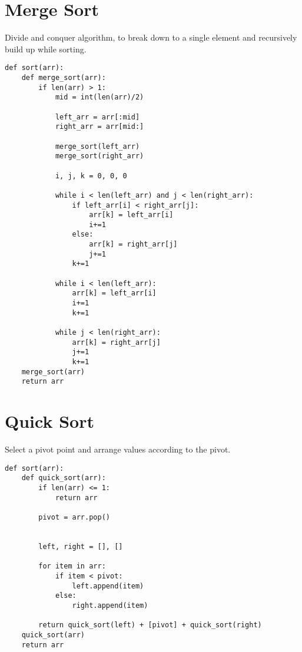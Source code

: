 \documentclass[24pt, a4]{article}
\begin{document}
\section{Merge Sort}
Divide and conquer algorithm, to break down to a single element and recursively build up while sorting.
\begin{lstlisting}
def sort(arr):
    def merge_sort(arr):
        if len(arr) > 1:
            mid = int(len(arr)/2)

            left_arr = arr[:mid]
            right_arr = arr[mid:]

            merge_sort(left_arr)
            merge_sort(right_arr)

            i, j, k = 0, 0, 0

            while i < len(left_arr) and j < len(right_arr):
                if left_arr[i] < right_arr[j]:
                    arr[k] = left_arr[i]
                    i+=1
                else:
                    arr[k] = right_arr[j]
                    j+=1
                k+=1

            while i < len(left_arr):
                arr[k] = left_arr[i]
                i+=1
                k+=1

            while j < len(right_arr):
                arr[k] = right_arr[j]
                j+=1
                k+=1
    merge_sort(arr)
    return arr
\end{lstlisting}
\section{Quick Sort}
Select a pivot point and arrange values according to the pivot.
\begin{lstlisting}
def sort(arr):
    def quick_sort(arr):
        if len(arr) <= 1:
            return arr

        pivot = arr.pop()


        left, right = [], []

        for item in arr:
            if item < pivot:
                left.append(item)
            else:
                right.append(item)

        return quick_sort(left) + [pivot] + quick_sort(right)
    quick_sort(arr)
    return arr
\end{lstlisting}
\end{document}
